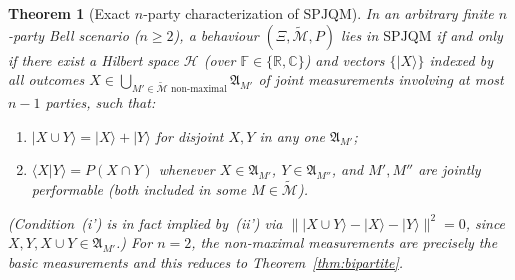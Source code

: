 \documentclass[11pt,a4paper]{article}
\newtheorem{theorem}{Theorem}[section]
\theoremstyle{definition}
\theoremstyle{remark}
\newcommand{\HH}{\mathcal{H}}
\newcommand{\tcM}{\widetilde{\mathcal{M}}}
\newcommand{\EA}{\mathfrak{A}}
\newcommand{\SPJQM}{\mathrm{SPJQM}}
\newcommand{\ket}[1]{|#1\rangle}
\newcommand{\braket}[2]{\langle #1 | #2 \rangle}
\newcommand{\norm}[1]{\|#1\|}
\newcommand{\F}{\mathbb{F}}
\begin{document}
\begin{theorem}[Exact $n$-party characterization of $\SPJQM$]
\label{thm:nparty}
In an arbitrary finite $n$-party Bell scenario ($n \ge 2$), a behaviour $(\Xi, \tcM, P)$ lies in $\SPJQM$ if and only if there exist a Hilbert space $\HH$ (over $\F \in \{\mathbb{R},\mathbb{C}\}$) and vectors $\{\ket{X}\}$ indexed by all outcomes $X \in \bigcup_{M' \in \tcM \text{ non-maximal}} \EA_{M'}$ of joint measurements involving at most $n - 1$ parties, such that:
\begin{enumerate}[label=(\roman*'),nosep]
\item $\ket{X \cup Y} = \ket{X} + \ket{Y}$ for disjoint $X, Y$ in any one $\EA_{M'}$;
\item $\braket{X}{Y} = P(X \cap Y)$ whenever $X \in \EA_{M'}$, $Y \in \EA_{M''}$, and $M', M''$ are jointly performable (both included in some $M \in \tcM$).
\end{enumerate}
(Condition~(i') is in fact implied by~(ii') via $\norm{\ket{X \cup Y} - \ket{X} - \ket{Y}}^2 = 0$, since $X, Y, X \cup Y \in \EA_{M'}$.) For $n = 2$, the non-maximal measurements are precisely the basic measurements and this reduces to Theorem~\ref{thm:bipartite}.
\end{theorem}
\end{document}
